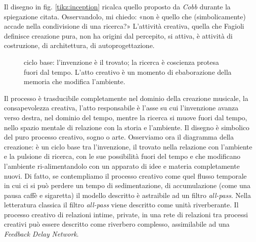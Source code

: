 \documentclass{../../lib/gs}
\begin{document}
Il disegno in fig. \ref{tikz:inception} ricalca quello proposto da \emph{Cobb}
durante la spiegazione citata.
Osservandolo, mi chiedo: «non è quello che (simbolicamente) accade nella
condivisione di una ricerca?» L'attività creativa, quella che Fagioli definisce
creazione pura, non ha origini dal percepito, si attiva, è attività di
costruzione, di architettura, di autoprogettazione.

\begin{figure}[ht]
  \centering
  \caption{ciclo base: l'invenzione è il trovato; la ricerca è coscienza protesa
  fuori dal tempo. L'atto creativo è un momento di ebaborazione della memoria che
  modifica l'ambiente.}
  \label{tikz:ciclobase}
\end{figure}

Il processo è trasducibile completamente nel dominio della creazione musicale,
la consapevolezza creativa, l'atto responsabile è l'asse su cui l'invenzione
avanza verso destra, nel dominio del tempo, mentre la ricerca si muove fuori
dal tempo, nello spazio mentale di relazione con la storia e l'ambiente.
Il disegno è simbolico del puro processo creativo, sogno o arte.
%
%
Osserviamo ora il diagramma della creazione: è un ciclo base tra l'invenzione,
il trovato nella relazione con l'ambiente e la pulsione di ricerca, con le sue
possibilità fuori del tempo e che modificano l'ambiente ri-alimentandolo con un
apparato di idee e materia completamente nuovi. Di fatto, se contempliamo il
processo creativo come quel flusso temporale in cui ci si può perdere un tempo
di sedimentazione, di accumulazione (come una pausa caffè e sigaretta) il
modello descritto è astraibile ad un filtro \emph{all-pass}. Nella letteratura
classica il filtro \emph{all-pass} viene descritto come unità riverberante. Il
processo creativo di relazioni intime, private, in una rete di relazioni tra
processi creativi può essere descritto come riverbero complesso, assimilabile
ad una \emph{Feedback Delay Network}.

\end{document}
